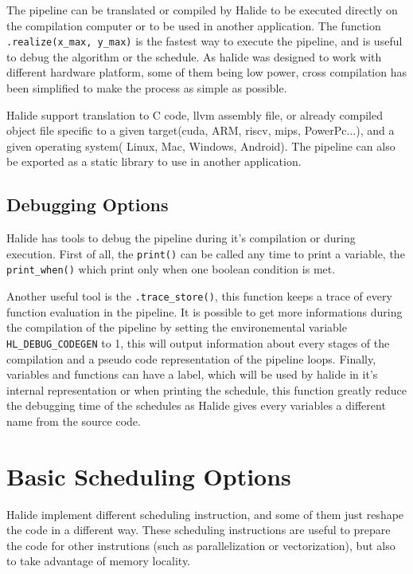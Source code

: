 	The pipeline can be translated or compiled by Halide to be executed directly on the compilation computer or to be used in another application.
	The function \verb|.realize(x_max, y_max)| is the fastest way to execute the  pipeline, and is useful to debug the algorithm or the schedule. As halide was designed to work with different hardware platform, some of them being low power, cross compilation has been simplified to make the process as simple as possible.
	
	 Halide support translation to C code, \gls{llvm} assembly file, or already compiled object file specific to a given target(\gls{cuda}, ARM, \gls{riscv}, \gls{mips}, PowerPc...), and a given operating system( Linux, Mac, Windows, Android). The pipeline can also be exported as a static library to use in another application.

\subsection{Debugging Options}
	Halide has tools to debug the pipeline during it's compilation or during execution. First of all, the \verb|print()| can be called any time to print a variable, the \verb|print_when()| which print only when one boolean condition is met.

	Another useful tool is the \verb|.trace_store()|, this function keeps a trace of every function evaluation in the pipeline. It is possible to get more informations during the compilation of the pipeline by setting the environemental variable \verb|HL_DEBUG_CODEGEN| to 1, this will output information about every stages of the compilation and a pseudo code representation of the pipeline loops.
	Finally, variables and functions can have a label, which will be used by halide in it's internal representation or when printing the schedule, this function greatly reduce the debugging time of the schedules as Halide gives every variables a different name from the source code.

	\section {Basic Scheduling Options}
	\label{section:scheduling}

	Halide implement different scheduling instruction, and some of them just reshape the code in a different way. These scheduling instructions are useful to prepare the code for other instrutions (such as parallelization or vectorization), but also to  take advantage of memory locality.
\newcommand\EIW{.4\textwidth}
\newcommand\ECW{\textwidth - \EIW}
